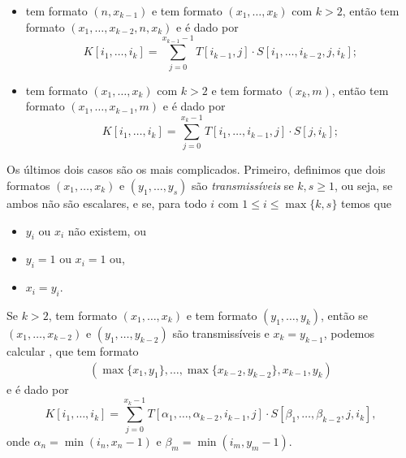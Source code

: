 \documentclass{article}
\begin{document}
\begin{itemize}
    \item {} tem formato $(n, x_{k-1})$ e  tem formato $(x_1, \dots, x_k)$ com $k > 2$, então  tem formato $(x_1, \dots, x_{k-2}, n, x_k)$ e é dado por \begin{equation}
        K[i_1, \dots, i_k] = \sum_{j = 0}^{x_{k-1} - 1} T[i_{k-1},j] \cdot S[i_1, \dots, i_{k-2}, j, i_k];
    \end{equation}

    \item {} tem formato $(x_1, \dots, x_k)$ com $k > 2$ e  tem formato $(x_k, m)$, então  tem formato $(x_1, \dots, x_{k-1}, m)$ e é dado por \begin{equation}
        K[i_1, \dots, i_k] = \sum_{j = 0}^{x_k - 1} T[i_1, \dots, i_{k-1}, j] \cdot S[j, i_k];
    \end{equation}
\end{itemize}

Os últimos dois casos são os mais complicados. Primeiro, definimos que dois formatos $(x_1, \dots, x_k)$ e $(y_1, \dots, y_s)$ são \textit{transmissíveis} se $k, s \geq 1$, ou seja, se ambos não são escalares, e se, para todo $i$ com $1 \leq i \leq \max\{k, s\}$ temos que \begin{itemize}
    \item $y_i$ ou $x_i$ não existem, ou
    \item $y_i = 1$ ou $x_i = 1$ ou,
    \item $x_i = y_i$.
\end{itemize}
Se $k > 2$,  tem formato $(x_1, \dots, x_k)$ e  tem formato $(y_1, \dots, y_k)$, então se $(x_1, \dots, x_{k-2})$ e $(y_1, \dots, y_{k-2})$ são transmissíveis e $x_k = y_{k-1}$, podemos calcular , que tem formato \begin{align}
    (\max\{x_1, y_1\}, \dots, \max\{x_{k-2}, y_{k-2}\}, x_{k-1}, y_k)
\end{align} e é dado por \begin{equation}
    K[i_1, \dots, i_k] = \sum_{j = 0}^{x_k - 1} T[\alpha_1, \dots, \alpha_{k-2}, i_{k-1}, j] \cdot S[\beta_1, \dots, \beta_{k-2}, j, i_k],
\end{equation} onde $\alpha_n = \min(i_n, x_n - 1)$ e $\beta_m = \min(i_m, y_m - 1)$.
\end{document}
